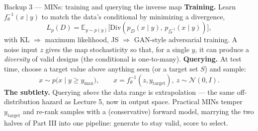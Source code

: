 \documentclass[10pt, aspectratio=169]{beamer}
\begin{document}
\begin{frame}{Backup 3 --- MINs: training and querying the inverse map}
\footnotesize
\textbf{Training.} Learn $f^{-1}_\theta(x\mid y)$ to match the data's conditional by minimizing a divergence,
\[
L_p(D) = \mathbb{E}_{y\sim p(y)}\big[\mathrm{Div}(p_D(x\mid y),\, p_{f^{-1}_\theta}(x\mid y))\big],
\]
with KL $\Rightarrow$ maximum likelihood, JS $\Rightarrow$ GAN-style adversarial training. A noise input $z$ gives the map stochasticity so that, for a single $y$, it can produce a \emph{diversity} of valid designs (the conditional is one-to-many).
\medskip
\textbf{Querying.} At test time, choose a target value above anything seen (or a target set $S$) and sample:
\[
x \sim p\big(x\mid y\ge y_{\max}\big), \qquad x = f^{-1}_\theta(z, y_{\text{target}}),\ z\sim\mathcal{N}(0,I).
\]
\textbf{The subtlety.} Querying \emph{above} the data range is extrapolation --- the same off-distribution hazard as Lecture 5, now in output space. Practical MINs temper $y_{\text{target}}$ and re-rank samples with a (conservative) forward model, marrying the two halves of Part III into one pipeline: generate to stay valid, score to select.
\end{frame}
\end{document}
